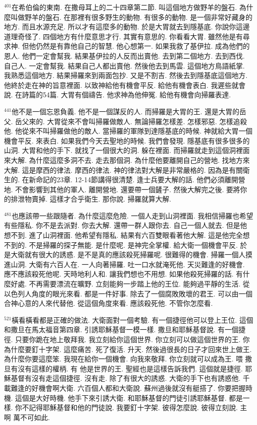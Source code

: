 \documentclass{book}
\begin{document}
$^{401}$在希伯倫的東南.
在撒母耳上的二十四章第二節.
叫這個地方做野羊的盤石.
為什麼叫做野羊的盤石.
在那裡有很多野生的動物.
有很多的動物.
是一個非常好藏身的地方.
而且水源充足.
所以才有這麼多的動物.
於是大胃就去到隱基底.
你說你這邊道理奇怪了.
四個地方有什麼意思才行.
其實有意思的.
你看看大胃.
雖然他是有尋求神.
但他仍然是有靠他自己的智慧.
他心想第一.
如果我救了基伊拉.
成為他們的恩人.
他們一定會幫我.
結果基伊拉的人反而出賣他.
去到第二個地方.
去到西伐.
自己人.
一定會幫我.
結果自己人都出賣他.
然後他去到馬雲.
這個地方鳥語紙掌.
我熟悉這個地方.
結果掃羅來到兩面包抄.
又是不割吉.
然後去到隱基底這個地方.
他終於走在神的旨意裡面.
以致神給他有機會平反.
給他有機會表白.
我遲些就會說.
在詩篇的54篇.
大胃有個禱告.
他求神為他伸冤.
給他有機會向掃羅表達.

$^{441}$他不是一個忘恩負義.
他不是一個謀反的人.
而掃羅是大胃的王.
還是大胃的岳父.
岳父來的.
大胃從來不會叫掃羅做敵人.
無論掃羅怎樣差.
怎樣邪惡.
怎樣追殺他.
他從來不叫掃羅做他的敵人.
當掃羅的軍隊到達隱基底的時候.
神就給大胃一個機會平反.
來表白.
如果我們今天去聖地的時候.
我們會發現.
隱基底有很多很多的山洞.
大胃和他的手下.
就找了一個很大的洞.
躲在裡面.
而掃羅就走到這個洞裡面來大解.
為什麼這麼多洞不去.
走去那個洞.
為什麼他要離開自己的營地.
找地方來大解.
這是摩西的律法.
摩西的律法.
神的律法對大解是非常嚴格的.
因為是有關衛生的.
在新命記的23章.
12-14節講得很清楚.
逢士兵要大解的話.
他們必須離開營地.
不會影響到其他的軍人.
離開營地.
還要帶一個鏟子.
然後大解完之後.
要將你的排泄物賣掉.
這樣才合乎衛生.
那你說.
掃羅就算大解.

$^{481}$也應該帶一些跟隨者.
為什麼這麼危險.
一個人走到山洞裡面.
我相信掃羅也希望有些隱私.
你不是去派對.
你去大解.
還帶一群人跟你去.
自己一個人就去.
但是他想不到.
進了山洞裡面.
他希望有隱私.
結果有六百雙眼看著他大解.
這是他完全想不到的.
不是掃羅的探子無能.
是什麼呢.
是神完全掌權.
給大衛一個機會平反.
於是大衛就有很大的誘惑.
是不是真的應該殺死掃羅呢.
很難得的機會.
掃羅一個人摸進山洞.
大衛有六百人在.
一人向著掃羅.
吐一口水就淹死他.
天災難逢的好機會.
應不應該殺死他呢.
天時地利人和.
讓我們想也不用想.
如果他殺死掃羅的話.
有什麼好處.
不再需要漂流在曠野.
立刻能夠一步踏上他的王位.
能夠過平靜的生活.
從以色列人角度的眼光來看.
都是一件好事.
除去了一個腐敗敗壞的君王.
可以由一個合神心意的人來代替他.
從這個角度來看.
應該殺死他.
不管你怎麼看.

$^{521}$橫看橫看都是正確的做法.
大衛面對一個考驗.
有一個捷徑他可以登上王位.
這個和撒旦在馬太福音第四章.
引誘耶穌基督一模一樣.
撒旦和耶穌基督說.
有一個捷徑.
只要你跪在地上敬拜我.
我立刻給你這個世界.
你立刻可以做這個世界的王.
你為什麼要釘十字架.
這麼痛苦.
死了復活.
升天.
然後過很長的日子才回來世上做王.
為什麼你要這麼笨.
我現在給你一個機會.
向我來敬拜.
你立刻就可以成為王.
喂 撒旦有沒有這樣的權柄.
有 他是世界的王.
聖經也是這樣告訴我們.
這個就是捷徑.
耶穌基督有沒有走這個捷徑.
沒有走.
除了有很大的誘惑.
大衛的手下也有誘惑他.
千載難逢的好機會啊大衛.
六百個人都和大衛說.
蘇州過後就沒有艇搭了.
你要把握時機.
這個是大好時機.
他手下來引誘大衛.
和耶穌基督的門徒引誘耶穌基督.
都是一樣.
你不記得耶穌基督和他的門徒說.
我要釘十字架.
彼得怎麼說.
彼得立刻說.
主啊 萬不可如此.
\end{document}
